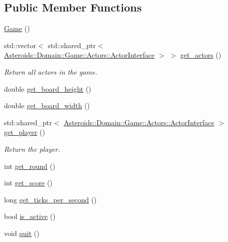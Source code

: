 \subsection*{Public Member Functions}
\begin{DoxyCompactItemize}
\item 
\hyperlink{classAsteroids_1_1Domain_1_1Game_1_1Game_a93e2f263a0149964d2ff83f2554db5af}{Game} ()
\item 
std\+::vector$<$ std\+::shared\+\_\+ptr$<$ \hyperlink{classAsteroids_1_1Domain_1_1Game_1_1Actors_1_1ActorInterface}{Asteroids\+::\+Domain\+::\+Game\+::\+Actors\+::\+Actor\+Interface} $>$ $>$ \hyperlink{classAsteroids_1_1Domain_1_1Game_1_1Game_af6a7d82ef71615d83aba515a07487641}{get\+\_\+actors} ()
\begin{DoxyCompactList}\small\item\em Return all actors in the game. \end{DoxyCompactList}\item 
double \hyperlink{classAsteroids_1_1Domain_1_1Game_1_1Game_ab7a8ccde8006ddaa3037f1d1964fba5e}{get\+\_\+board\+\_\+height} ()
\item 
double \hyperlink{classAsteroids_1_1Domain_1_1Game_1_1Game_a62894e4b69b28bf686fb646351bfa953}{get\+\_\+board\+\_\+width} ()
\item 
std\+::shared\+\_\+ptr$<$ \hyperlink{classAsteroids_1_1Domain_1_1Game_1_1Actors_1_1ActorInterface}{Asteroids\+::\+Domain\+::\+Game\+::\+Actors\+::\+Actor\+Interface} $>$ \hyperlink{classAsteroids_1_1Domain_1_1Game_1_1Game_ae036a59145a83f0e66e91acce693035b}{get\+\_\+player} ()
\begin{DoxyCompactList}\small\item\em Return the player. \end{DoxyCompactList}\item 
int \hyperlink{classAsteroids_1_1Domain_1_1Game_1_1Game_abc24d11951291f8ceab1d20a6652b46e}{get\+\_\+round} ()
\item 
int \hyperlink{classAsteroids_1_1Domain_1_1Game_1_1Game_ae2128bded3b91a2bbf7546009a8e5385}{get\+\_\+score} ()
\item 
long \hyperlink{classAsteroids_1_1Domain_1_1Game_1_1Game_a4dea8a8da52ffe1589fe9c4493824d0f}{get\+\_\+ticks\+\_\+per\+\_\+second} ()
\item 
bool \hyperlink{classAsteroids_1_1Domain_1_1Game_1_1Game_a29d018d13b934b31e4192758422fea68}{is\+\_\+active} ()
\item 
void \hyperlink{classAsteroids_1_1Domain_1_1Game_1_1Game_a7e1bbc8f577a798f57d736bdc51fd149}{quit} ()

\end{DoxyCompactItemize}
